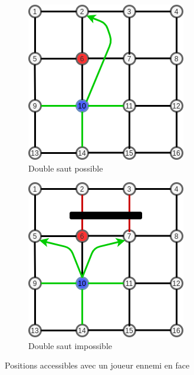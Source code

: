 \documentclass[a4paper]{article}
\begin{document}
\begin{figure}[h]
    \centering
    \begin{subfigure}{.5\textwidth}
        \centering
        \includegraphics[width=0.75\linewidth]{valid_position_e1.png}
        \caption{Double saut possible}
        \label{fig:valid_pos_e1}
    \end{subfigure}%
    \begin{subfigure}{.5\textwidth}
        \centering
        \includegraphics[width=0.75\linewidth]{valid_position_e2.png}
        \caption{Double saut impossible}
        \label{fig:valid_pos_e2}
    \end{subfigure}
    
    \caption{Positions accessibles avec un joueur ennemi en face}
    \label{fig:valid_pos_ennemy}
\end{figure}
\end{document}
